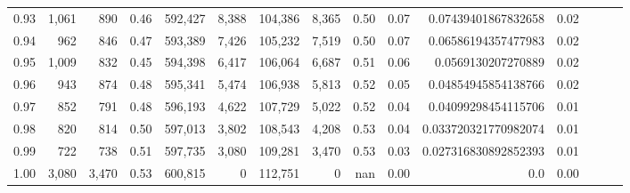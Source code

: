 \begin{tabular}{rrrrrrrrrrrrrrr}
0.93 &   1,061 &    890 &  0.46 &  592,427 &    8,388 &  104,386 &    8,365 &  0.50 &  0.07 &   0.07439401867832658 &      0.02 \\
0.94 &     962 &    846 &  0.47 &  593,389 &    7,426 &  105,232 &    7,519 &  0.50 &  0.07 &   0.06586194357477983 &      0.02 \\
0.95 &   1,009 &    832 &  0.45 &  594,398 &    6,417 &  106,064 &    6,687 &  0.51 &  0.06 &    0.0569130207270889 &      0.02 \\
0.96 &     943 &    874 &  0.48 &  595,341 &    5,474 &  106,938 &    5,813 &  0.52 &  0.05 &   0.04854945854138766 &      0.02 \\
0.97 &     852 &    791 &  0.48 &  596,193 &    4,622 &  107,729 &    5,022 &  0.52 &  0.04 &   0.04099298454115706 &      0.01 \\
0.98 &     820 &    814 &  0.50 &  597,013 &    3,802 &  108,543 &    4,208 &  0.53 &  0.04 &  0.033720321770982074 &      0.01 \\
0.99 &     722 &    738 &  0.51 &  597,735 &    3,080 &  109,281 &    3,470 &  0.53 &  0.03 &  0.027316830892852393 &      0.01 \\
1.00 &   3,080 &  3,470 &  0.53 &  600,815 &        0 &  112,751 &        0 &   nan &  0.00 &                   0.0 &      0.00 \\
\bottomrule
\end{tabular}
